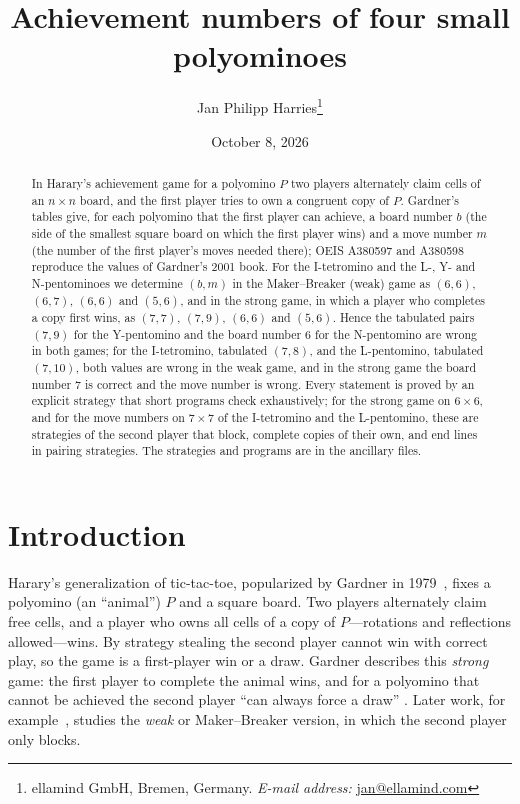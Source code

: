 \documentclass[11pt]{article}
\title{Achievement numbers of four small polyominoes}
\author{Jan Philipp Harries\thanks{ellamind GmbH, Bremen, Germany. \textit{E-mail address:} \href{mailto:jan@ellamind.com}{jan@ellamind.com}}}
\date{October 8, 2026}
\theoremstyle{definition}
\theoremstyle{remark}
\begin{document}
\maketitle

\begin{abstract}
In Harary's achievement game for a polyomino $P$ two players alternately claim cells of an
$n\times n$ board, and the first player tries to own a congruent copy of $P$. Gardner's tables give,
for each polyomino that the first player can achieve, a board number $b$ (the side of the smallest
square board on which the first player wins) and a move number $m$ (the number of the first
player's moves needed there); OEIS A380597 and A380598 reproduce the values of Gardner's 2001 book.
For the I-tetromino and the L-, Y- and N-pentominoes we determine $(b,m)$ in the Maker--Breaker
(weak) game as $(6,6)$, $(6,7)$, $(6,6)$ and $(5,6)$, and in the strong game, in which a player who
completes a copy first wins, as $(7,7)$, $(7,9)$, $(6,6)$ and $(5,6)$. Hence the tabulated pairs
$(7,9)$ for the Y-pentomino and the board number $6$ for the N-pentomino are wrong in both games;
for the I-tetromino, tabulated $(7,8)$, and the L-pentomino, tabulated $(7,10)$, both values are
wrong in the weak game, and in the strong game the board number $7$ is correct and the move number
is wrong. Every statement is proved by an explicit strategy that short programs check
exhaustively; for the strong game on $6\times 6$, and for the move numbers on $7\times 7$ of the
I-tetromino and the L-pentomino, these are strategies of the second player that block, complete
copies of their own, and end lines in pairing strategies. The strategies and programs are in the ancillary files.
\end{abstract}

\section{Introduction}

Harary's generalization of tic-tac-toe, popularized by Gardner in 1979~\cite{Gar79}, fixes a
polyomino (an ``animal'') $P$ and a square board. Two players alternately claim free cells, and a
player who owns all cells of a copy of $P$---rotations and reflections allowed---wins. By strategy
stealing the second player cannot win with correct play, so the game is a first-player win or a
draw. Gardner describes this \emph{strong} game: the first player to complete the animal wins, and
for a polyomino that cannot be achieved the second player ``can always force a draw''
\cite[p.~497]{Gar01}. Later work, for example~\cite{HSP07,Sie04}, studies the \emph{weak} or Maker--Breaker version, in
which the second player only blocks.
\end{document}
